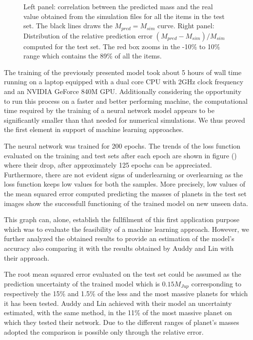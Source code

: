 \documentclass[a4paper,10pt]{report}
\begin{document}
\begin{figure}
    \begin{center}
        \scalebox{0.85}{}
    \end{center}
    \caption{Left panel: correlation between the predicted mass and the real value obtained from the simulation files
    for all the items in the test set. The black lines draws the $M_{pred} = M_{sim}$ curve.
    Right panel: Distribution of the relative prediction error $(M_{pred} - M_{sim})/M_{sim}$ computed for the test set. The red box 
    zooms in the -10\% to 10\% range which contains the 89\% of all the items.}
\end{figure}

The training of the previously presented model took about 5 hours of wall time running on a laptop equipped with a dual core CPU
with 2GHz clock frequency and an NVIDIA GeForce 840M GPU. Additionally considering the opportunity to run
this process on a faster and better performing machine, the computational time required by the training of a neural network
model appears to be significantly smaller than that needed for numerical simulations. We thus proved the
first element in support of machine learning approaches.

The neural network was trained for 200 epochs. The trends of the loss function evaluated on the training and test sets after each epoch are shown
in figure () where their drop, after approximately 125 epochs can be appreciated.
Furthermore, there are not evident signs of underlearning or overlearning as the loss function keeps low values for both the samples.
More precisely, low values of the mean squared error computed predicting the masses of planets in the test set images 
show the successfull functioning of the trained model on new unseen data.

This graph can, alone, establish the fullfilment of this first application purpose which was to evaluate the feasibility of
a machine learning approach. However, we further analyzed the obtained results to provide 
an estimation of the model's accuracy also comparing it with the results obtained by Auddy and Lin with their
approach. 

The root mean squared error evaluated on the test set could be assumed as the
prediction uncertainty of the trained model which is $0.15 M_{Jup}$ corresponding to respectively
the 15\% and 1.5\% of the less and the most massive planets
for which it has been tested. Auddy and Lin achieved with their model an uncertainty estimated, with the same method,
in the 11\% 
of the most massive planet on which they tested their network. 
Due to the different ranges of planet's masses adopted the comparison is possible only through the relative error.
\end{document}
